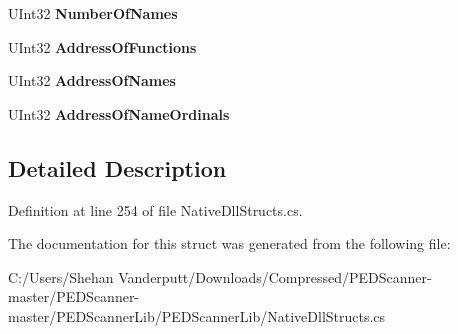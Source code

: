 \begin{DoxyCompactItemize}
U\+Int32 {\bfseries Number\+Of\+Names}
\item 
\mbox{\label{struct_p_e_d_scanner_lib_1_1_struct_1_1_i_m_a_g_e___e_x_p_o_r_t___d_i_r_e_c_t_o_r_y_a9e250879f791f702988f8b338e236087}} 
U\+Int32 {\bfseries Address\+Of\+Functions}
\item 
\mbox{\label{struct_p_e_d_scanner_lib_1_1_struct_1_1_i_m_a_g_e___e_x_p_o_r_t___d_i_r_e_c_t_o_r_y_a215647227cf196dee64347260e58e215}} 
U\+Int32 {\bfseries Address\+Of\+Names}
\item 
\mbox{\label{struct_p_e_d_scanner_lib_1_1_struct_1_1_i_m_a_g_e___e_x_p_o_r_t___d_i_r_e_c_t_o_r_y_a5cff9713e81a9ab662f9b2f262b9b4c3}} 
U\+Int32 {\bfseries Address\+Of\+Name\+Ordinals}
\end{DoxyCompactItemize}


\subsection{Detailed Description}


Definition at line 254 of file Native\+Dll\+Structs.\+cs.



The documentation for this struct was generated from the following file\+:\begin{DoxyCompactItemize}
\item 
C\+:/\+Users/\+Shehan Vanderputt/\+Downloads/\+Compressed/\+P\+E\+D\+Scanner-\/master/\+P\+E\+D\+Scanner-\/master/\+P\+E\+D\+Scanner\+Lib/\+P\+E\+D\+Scanner\+Lib/Native\+Dll\+Structs.\+cs\end{DoxyCompactItemize}

